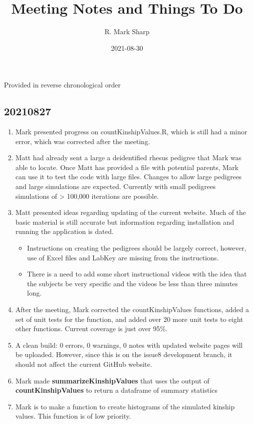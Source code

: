 \documentclass[
]{article}
\title{Meeting Notes and Things To Do}
\author{R. Mark Sharp}
\date{2021-08-30}
\providecommand{\tightlist}{%
  \setlength{\itemsep}{0pt}\setlength{\parskip}{0pt}}
\begin{document}
\maketitle

Provided in reverse chronological order

\hypertarget{section}{%
\subsection{20210827}\label{section}}

\begin{enumerate}
\def\labelenumi{\arabic{enumi}.}
\tightlist
\item
  Mark presented progress on countKinshipValues.R, which is still had a
  minor error, which was corrected after the meeting.
\item
  Matt had already sent a large a deidentified rhesus pedigree that Mark
  was able to locate. Once Matt has provided a file with potential
  parents, Mark can use it to test the code with large files. Changes to
  allow large pedigrees and large simulations are expected. Currently
  with small pedigrees simulations of \textgreater{} 100,000 iterations
  are possible.
\item
  Matt presented ideas regarding updating of the current website. Much
  of the basic material is still accurate but information regarding
  installation and running the application is dated.

  \begin{itemize}
  \tightlist
  \item
    Instructions on creating the pedigrees should be largely correct,
    however, use of Excel files and LabKey are missing from the
    instructions.
  \item
    There is a need to add some short instructional videos with the idea
    that the subjects be very specific and the videos be less than three
    minutes long.
  \end{itemize}
\item
  After the meeting, Mark corrected the countKinshipValues functions,
  added a set of unit tests for the function, and added over 20 more
  unit tests to eight other functions. Current coverage is just over
  95\%.
\item
  A clean build: 0 errors, 0 warnings, 0 notes with updated website
  pages will be uploaded. However, since this is on the issue8
  development branch, it should not affect the current GitHub website.
\item
  Mark made \textbf{summarizeKinshipValues} that uses the output of
  \textbf{countKinshipValues} to return a dataframe of summary
  statistics
\item
  Mark is to make a function to create histograms of the simulated
  kinship values. This function is of low priority.
\end{enumerate}
\end{document}

